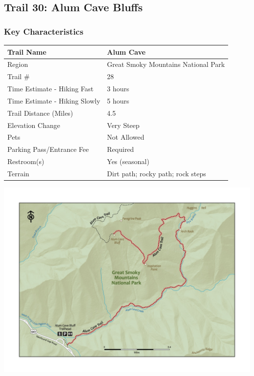\documentclass[
  letterpaper,
  DIV=11,
  numbers=noendperiod]{scrartcl}
\begin{document}
\hypertarget{trail-30-alum-cave-bluffs}{%
\subsection{Trail 30: Alum Cave
Bluffs}\label{trail-30-alum-cave-bluffs}}

\hypertarget{key-characteristics-28}{%
\subsubsection{Key Characteristics}\label{key-characteristics-28}}

\begin{longtable}[]{@{}ll@{}}
\toprule\noalign{}
Trail Name & Alum Cave \\
\midrule\noalign{}
\endhead
\bottomrule\noalign{}
\endlastfoot
Region & Great Smoky Mountains National Park \\
Trail \# & 28 \\
Time Estimate - Hiking Fast & 3 hours \\
Time Estimate - Hiking Slowly & 5 hours \\
Trail Distance (Miles) & 4.5 \\
Elevation Change & Very Steep \\
Pets & Not Allowed \\
Parking Pass/Entrance Fee & Required \\
Restroom(s) & Yes (seasonal) \\
Terrain & Dirt path; rocky path; rock steps \\
\end{longtable}

\includegraphics{maps/trail-30-map.jpeg}
\end{document}
